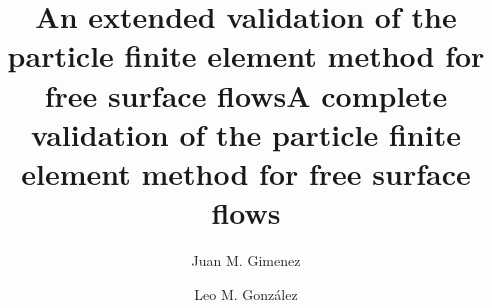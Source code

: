 \documentclass[review]{elsarticle}
\begin{document}
\begin{frontmatter}

\title{An extended validation of the particle finite element method for free surface flows}
\title{A complete validation of the particle finite element method for free surface flows}


\author[mymainaddress]{Juan M. Gimenez}
\author[mysecondaryaddress]{Leo M. Gonz\'{a}lez}
\address[mymainaddress]{Centro de Investigaci\'on de M\'etodos Computacionales (CIMEC) - UNL/CONICET, Predio Conicet-Santa Fe Colectora Ruta Nac 168
	      Paraje El Pozo, Santa Fe, Argentina.}
\address[mysecondaryaddress]{Escuela T\'{e}cnica Superior de Ingenieros Navales, Universidad Polit\'{e}cnica de Madrid (ETSIN-UPM), Avd. Arco de la Victoria 4, Madrid, Spain}


\end{frontmatter}
\end{document}
